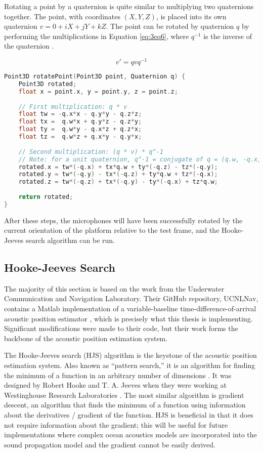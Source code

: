 \documentclass[11pt]{ucthesisCP}
\begin{document}
Rotating a point by a quaternion is quite similar to multiplying two quaternions together. The point, with coordinates \((X, Y, Z)\), is placed into its own quaternion \(v = 0 + iX + jY + kZ\). The point can be rotated by quaternion \(q\) by performing the multiplications in Equation \ref{eq:3eq6}, where \(q^{-1}\) is the inverse of the quaternion \cite{quaternionuse}.

\begin{equation} \label{eq:3eq6}
	v' = qvq^{-1}
\end{equation}

\begin{lstlisting}[language=C++]
Point3D rotatePoint(Point3D point, Quaternion q) {
	Point3D rotated;
	float x = point.x, y = point.y, z = point.z;
	
	// First multiplication: q * v
	float tw = -q.x*x - q.y*y - q.z*z;
	float tx =  q.w*x + q.y*z - q.z*y;
	float ty =  q.w*y - q.x*z + q.z*x;
	float tz =  q.w*z + q.x*y - q.y*x;
	
	// Second multiplication: (q * v) * q^-1
	// Note: for a unit quaternion, q^-1 = conjugate of q = (q.w, -q.x, -q.y, -q.z)
	rotated.x = tw*(-q.x) + tx*q.w + ty*(-q.z) - tz*(-q.y);
	rotated.y = tw*(-q.y) - tx*(-q.z) + ty*q.w + tz*(-q.x);
	rotated.z = tw*(-q.z) + tx*(-q.y) - ty*(-q.x) + tz*q.w;
	
	return rotated;
}
\end{lstlisting}

After these steps, the microphones will have been successfully rotated by the current orientation of the platform relative to the test frame, and the Hooke-Jeeves search algorithm can be run.

\subsection{Hooke-Jeeves Search} \label{ssec:3s9s2}
The majority of this section is based on the work from the Underwater Communication and Navigation Laboratory. Their GitHub repository, UCNLNav, contains a Matlab implementation of a variable-baseline time-difference-of-arrival acoustic position estimator \cite{ucnlnav}, which is precisely what this thesis is implementing. Significant modifications were made to their code, but their work forms the backbone of the acoustic position estimation system.

The Hooke-Jeeves search (HJS) algorithm is the keystone of the acoustic position estimation system. Also known as “pattern search,” it is an algorithm for finding the minimum of a function in an arbitrary number of dimensions \cite{hjsstan}. It was designed by Robert Hooke and T. A. Jeeves when they were working at Westinghouse Research Laboratories \cite{hjsog}. The most similar algorithm is gradient descent, an algorithm that finds the minimum of a function using information about the derivatives / gradient of the function. HJS is beneficial in that it does not require information about the gradient; this will be useful for future implementations where complex ocean acoustics models are incorporated into the sound propagation model and the gradient cannot be easily derived.
\end{document}
